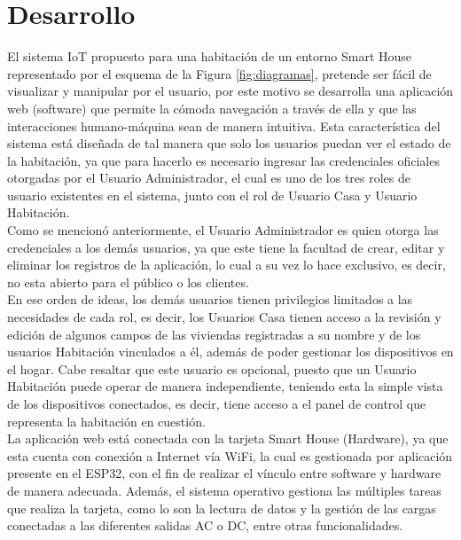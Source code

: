 \chapter{Desarrollo}

El sistema IoT propuesto para una habitación de un entorno Smart House representado por el esquema de la Figura \ref{fig:diagramas}, pretende ser fácil de visualizar y manipular por el usuario, por este motivo se desarrolla una aplicación web (software) que permite la cómoda navegación a través de ella y que las interacciones humano-máquina sean de manera intuitiva. Esta característica del sistema está diseñada de tal manera que solo los usuarios puedan ver el estado de la habitación, ya que para hacerlo es necesario ingresar las credenciales oficiales otorgadas por el Usuario Administrador, el cual es uno de los tres roles de usuario existentes en el sistema, junto con el rol de Usuario Casa y Usuario Habitación.\\

Como se mencionó anteriormente, el Usuario Administrador es quien otorga las credenciales a los demás usuarios, ya que este tiene la facultad de crear, editar y eliminar los registros de la aplicación, lo cual a su vez lo hace exclusivo, es decir, no esta abierto para el público o los clientes.\\ 

En ese orden de ideas, los demás usuarios tienen privilegios limitados a las necesidades de cada rol, es decir, los Usuarios Casa tienen acceso a la revisión y edición de algunos campos de las viviendas registradas a su nombre y de los usuarios Habitación vinculados a él, además de poder gestionar los dispositivos en el hogar. Cabe resaltar que este usuario es opcional, puesto que un Usuario Habitación puede operar de manera independiente, teniendo esta la simple vista de los dispositivos conectados, es decir, tiene acceso a el panel de control que representa la habitación en cuestión.\\
 
La aplicación web está conectada con la tarjeta Smart House (Hardware), ya que esta cuenta con conexión a Internet vía WiFi, la cual es gestionada por aplicación presente en el ESP32, con el fin de realizar el vínculo entre software y hardware de manera adecuada. Además, el sistema operativo gestiona las múltiples tareas que realiza la tarjeta, como lo son la lectura de datos y la gestión de las cargas conectadas a las diferentes salidas AC o DC, entre otras funcionalidades.\\

